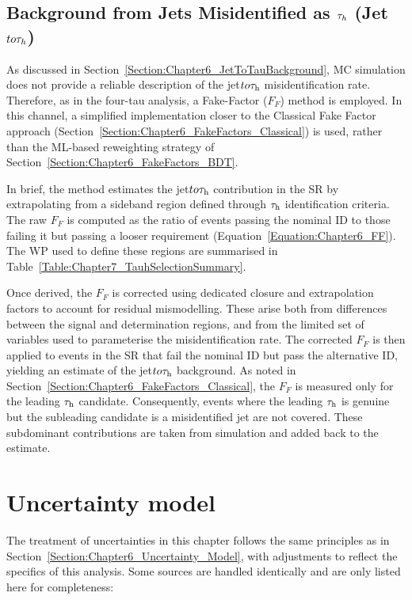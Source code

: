 \subsection{\texorpdfstring{Background from Jets Misidentified as $\tau_h$ (Jet $to \tau_h$)}{Background from Jets Misidentified as hadronic taus}}
\label{Section:Chapter7_FF}

As discussed in Section~\ref{Section:Chapter6_JetToTauBackground}, MC simulation does not provide a reliable description of the jet$to\tau_\mathrm{h}$ misidentification rate. Therefore, as in the four-tau analysis, a Fake-Factor ($F_F$) method is employed. In this channel, a simplified implementation closer to the Classical Fake Factor approach (Section~\ref{Section:Chapter6_FakeFactors_Classical}) is used, rather than the \ac{ML}-based reweighting strategy of Section~\ref{Section:Chapter6_FakeFactors_BDT}. 

In brief, the method estimates the jet$to\tau_\mathrm{h}$ contribution in the \ac{SR} by extrapolating from a sideband region defined through $\tau_\mathrm{h}$ identification criteria. The raw $F_F$ is computed as the ratio of events passing the nominal ID to those failing it but passing a looser requirement (Equation~\ref{Equation:Chapter6_FF}). The \ac{WP} used to define these regions are summarised in Table~\ref{Table:Chapter7_TauhSelectionSummary}.

Once derived, the $F_F$ is corrected using dedicated closure and extrapolation factors to account for residual mismodelling. These arise both from differences between the signal and determination regions, and from the limited set of variables used to parameterise the misidentification rate. The corrected $F_F$ is then applied to events in the \ac{SR} that fail the nominal ID but pass the alternative ID, yielding an estimate of the jet$to\tau_\mathrm{h}$ background. As noted in Section~\ref{Section:Chapter6_FakeFactors_Classical}, the $F_F$ is measured only for the leading $\tau_\mathrm{h}$ candidate. Consequently, events where the leading $\tau_\mathrm{h}$ is genuine but the subleading candidate is a misidentified jet are not covered. These subdominant contributions are taken from simulation and added back to the estimate.

\section{Uncertainty model}
\label{Section:Chapter7_UncertaintyModel}
The treatment of uncertainties in this chapter follows the same principles as in Section~\ref{Section:Chapter6_Uncertainty_Model}, with adjustments to reflect the specifics of this analysis. Some sources are handled identically and are only listed here for completeness:

